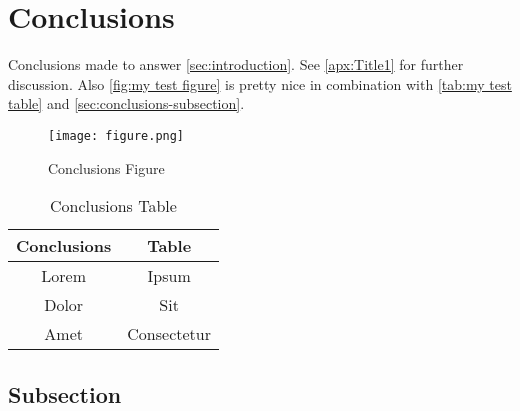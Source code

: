 \section{Conclusions}
\label{sec:conclusions}

Conclusions made to answer \autoref{sec:introduction}. See \autoref{apx:Title1} for further discussion. Also \autoref{fig:my test figure} is pretty nice in combination with \autoref{tab:my test table} and \autoref{sec:conclusions-subsection}.

\begin{figure}
    \centering
    \texttt{[image: figure.png]}
    \caption{Conclusions Figure}
    \label{fig:my test figure}
\end{figure}

\begin{table}
    \centering
    \begin{tabular}{|c|c|}
        \hline
        \textbf{Conclusions} & \textbf{Table} \\
        \hline
        Lorem                & Ipsum          \\
        Dolor                & Sit            \\
        Amet                 & Consectetur    \\
        \hline
    \end{tabular}
    \caption{Conclusions Table}
    \label{tab:my test table}
\end{table}


\subsection{Subsection}\label{sec:conclusions-subsection}